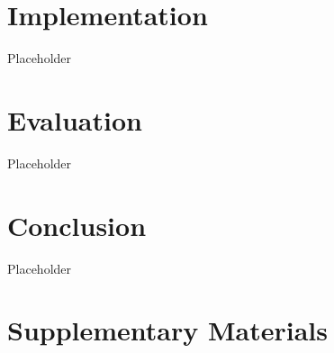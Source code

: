     \section{Implementation}
    \label{sec:implementation}



        Placeholder

    \section{Evaluation}
    \label{sec:evaluation}

        Placeholder

    \section{Conclusion}
    \label{sec:conclusion}

        Placeholder

    \section{Supplementary Materials}
    \label{sec:supplementary-materials}


    \pagebreak

    
    


